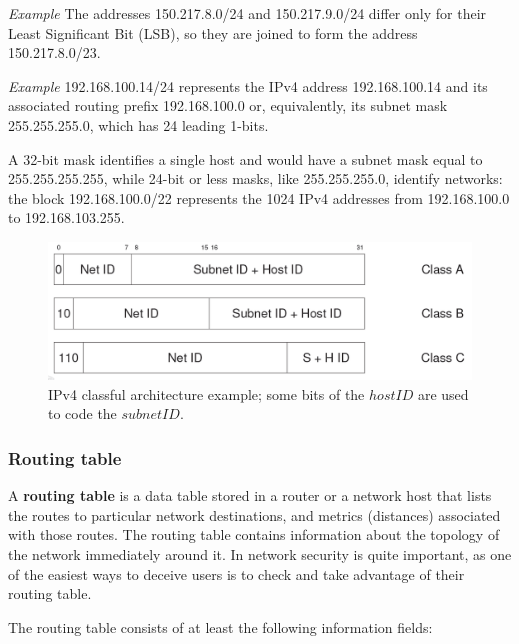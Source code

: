 \vspace{0.5em}

\emph{Example} The addresses 150.217.8.0/24 and 150.217.9.0/24 differ only for their Least Significant Bit (LSB), so they are joined to form the address 150.217.8.0/23.

\vspace{0.5em}

\emph{Example} 192.168.100.14/24 represents the IPv4 address 192.168.100.14 and its associated routing prefix 192.168.100.0 or, equivalently, its subnet mask 255.255.255.0, which has 24 leading 1-bits.

A 32-bit mask identifies a single host and would have a subnet mask equal to 255.255.255.255, while 24-bit or less masks, like 255.255.255.0, identify networks: the block 192.168.100.0/22 represents the 1024 IPv4 addresses from 192.168.100.0 to 192.168.103.255.

\begin{figure}[H]
    \centering
    \includegraphics[scale=0.58]{img/ipv4classes.png}
    \decoRule
    \caption{IPv4 classful architecture example; some bits of the $hostID$ are used to code the $subnetID$.}
    \label{fig:ipv4classes}
\end{figure}


\subsubsection{Routing table}
A \textbf{routing table} is a data table stored in a router or a network host that lists the routes to particular network destinations, and metrics (distances) associated with those routes. The routing table contains information about the topology of the network immediately around it. In network security is quite important, as one of the easiest ways to deceive users is to check and take advantage of their routing table.

The routing table consists of at least the following information fields:

